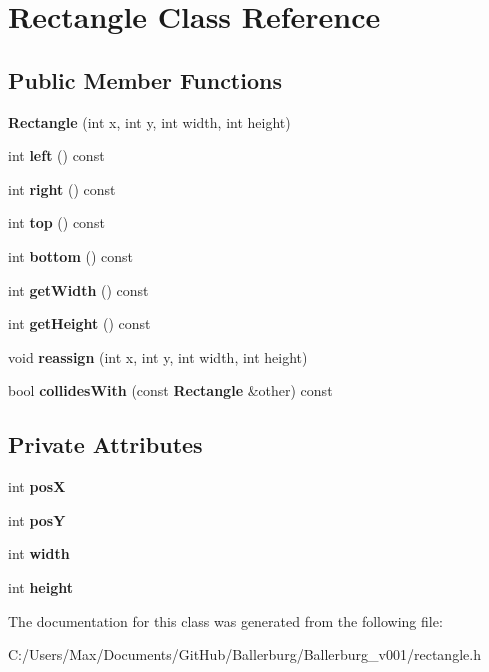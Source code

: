 \section{Rectangle Class Reference}
\label{class_rectangle}
\subsection*{Public Member Functions}
\begin{DoxyCompactItemize}
\item 
{\bfseries Rectangle} (int x, int y, int width, int height)\label{class_rectangle_a6fd48c1264965fd841b2d35b7736a352}

\item 
int {\bfseries left} () const \label{class_rectangle_a1f169cef3c9b8307e8dc7c6093bfdd14}

\item 
int {\bfseries right} () const \label{class_rectangle_a8e76ee84d39c8c063cb2ef0e1cb7f5df}

\item 
int {\bfseries top} () const \label{class_rectangle_a8eb6de2c6d532b2175bddd8484196eab}

\item 
int {\bfseries bottom} () const \label{class_rectangle_a46e18ff7c2ca4fd068442cabcd0b4046}

\item 
int {\bfseries get\+Width} () const \label{class_rectangle_a691ea1a449cad163e27bbf10ce65f98d}

\item 
int {\bfseries get\+Height} () const \label{class_rectangle_a45c28d3fd6b2f303530fb80b90e1c1c4}

\item 
void {\bfseries reassign} (int x, int y, int width, int height)\label{class_rectangle_a7f08779a8dbbd7cbf9ca6d8d31e272f8}

\item 
bool {\bfseries collides\+With} (const {\bf Rectangle} \&other) const \label{class_rectangle_a42278a22dbcfdfc05b22eebf7a9bda5d}

\end{DoxyCompactItemize}
\subsection*{Private Attributes}
\begin{DoxyCompactItemize}
\item 
int {\bfseries pos\+X}\label{class_rectangle_a686488c52756f4a4d7de622fa8f2b513}

\item 
int {\bfseries pos\+Y}\label{class_rectangle_a041ba9f18bfc8ff54240a141a4c5b6ee}

\item 
int {\bfseries width}\label{class_rectangle_a019ed802523594472e0032953b6062d4}

\item 
int {\bfseries height}\label{class_rectangle_ac564db1ed0dd61dd82a5276399bc72ad}

\end{DoxyCompactItemize}


The documentation for this class was generated from the following file\+:\begin{DoxyCompactItemize}
\item 
C\+:/\+Users/\+Max/\+Documents/\+Git\+Hub/\+Ballerburg/\+Ballerburg\+\_\+v001/rectangle.\+h\end{DoxyCompactItemize}
